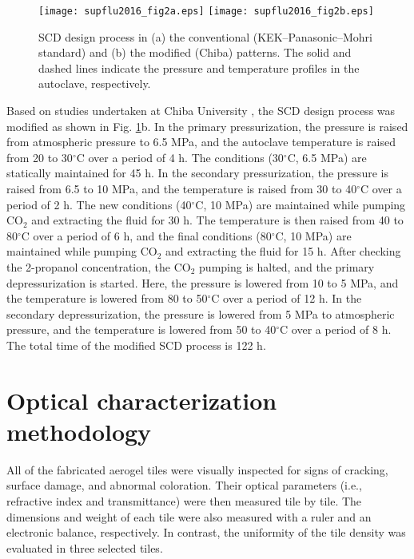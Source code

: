 \documentclass[5p,twocolumn]{elsarticle}
\begin{document}
\begin{figure}[t]
\centering 
\texttt{[image: supflu2016\_fig2a.eps]}
\texttt{[image: supflu2016\_fig2b.eps]}
\caption{SCD design process in (a) the conventional (KEK--Panasonic--Mohri standard) and (b) the modified (Chiba) patterns. The solid and dashed lines indicate the pressure and temperature profiles in the autoclave, respectively.}
\label{fig:fig2}
\end{figure}

Based on studies undertaken at Chiba University \cite{cite2}, the SCD design process was modified as shown in Fig. \ref{fig:fig2}b. In the primary pressurization, the pressure is raised from atmospheric pressure to 6.5 MPa, and the autoclave temperature is raised from 20 to 30$^{\circ }$C over a period of 4 h. The conditions (30$^{\circ }$C, 6.5 MPa) are statically maintained for 45 h. In the secondary pressurization, the pressure is raised from 6.5 to 10 MPa, and the temperature is raised from 30 to 40$^{\circ }$C over a period of 2 h. The new conditions (40$^{\circ }$C, 10 MPa) are maintained while pumping CO$_2$ and extracting the fluid for 30 h. The temperature is then raised from 40 to 80$^{\circ }$C over a period of 6 h, and the final conditions (80$^{\circ }$C, 10 MPa) are maintained while pumping CO$_2$ and extracting the fluid for 15 h. After checking the 2-propanol concentration, the CO$_2$ pumping is halted, and the primary depressurization is started. Here, the pressure is lowered from 10 to 5 MPa, and the temperature is lowered from 80 to 50$^{\circ }$C over a period of 12 h. In the secondary depressurization, the pressure is lowered from 5 MPa to atmospheric pressure, and the temperature is lowered from 50 to 40$^{\circ }$C over a period of 8 h. The total time of the modified SCD process is 122 h.

\section{Optical characterization methodology}
\label{4}

All of the fabricated aerogel tiles were visually inspected for signs of cracking, surface damage, and abnormal coloration. Their optical parameters (i.e., refractive index and transmittance) were then measured tile by tile. The dimensions and weight of each tile were also measured with a ruler and an electronic balance, respectively. In contrast, the uniformity of the tile density was evaluated in three selected tiles.
\end{document}
